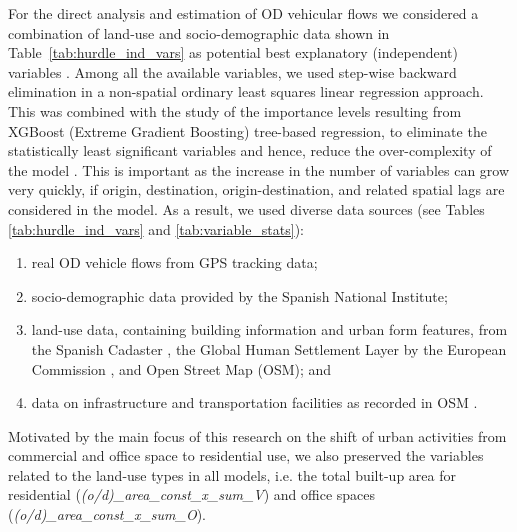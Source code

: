 For the direct analysis and estimation of OD vehicular flows
we considered a combination of land-use and socio-demographic data shown in Table~\ref{tab:hurdle_ind_vars} as potential best explanatory (independent) variables \citep{Krueger2023ACorrections}. %
Among all the available variables, we used step-wise backward elimination in a non-spatial ordinary least squares linear regression approach. This was combined with the study of the importance levels resulting from XGBoost (Extreme Gradient Boosting) tree-based regression, to eliminate the statistically least significant variables and hence, reduce the over-complexity of the model
. 
This is important as the increase in the number of variables can grow very quickly, if origin, destination, origin-destination, and related spatial lags are considered in the model.
As a result, we used diverse data sources %
(see Tables \ref{tab:hurdle_ind_vars} and \ref{tab:variable_stats}): 
\begin{enumerate}
    \item real OD vehicle flows from GPS tracking data; 
    \item socio-demographic data provided by the Spanish National Institute; 
    \item land-use data, containing building information and urban form features, from the Spanish Cadaster \citep{MinisteriodeHacienda.GobiernodeEspanaSedeInicio}, the Global Human Settlement Layer by the European Commission \citep{Pesaresi2023GHS-BUILT-CData}, and Open Street Map (OSM); and 
    \item data on infrastructure and transportation facilities as recorded in OSM \citep{OpenStreetMap}.
 \end{enumerate}
Motivated by the main focus of this research on the shift of urban activities from commercial and office space to residential use, we also preserved the variables related to the land-use types in all models, i.e. the total built-up area for residential (\emph{(o/d)\_area\_const\_x\_sum\_V}) and office spaces (\emph{(o/d)\_area\_const\_x\_sum\_O}).




